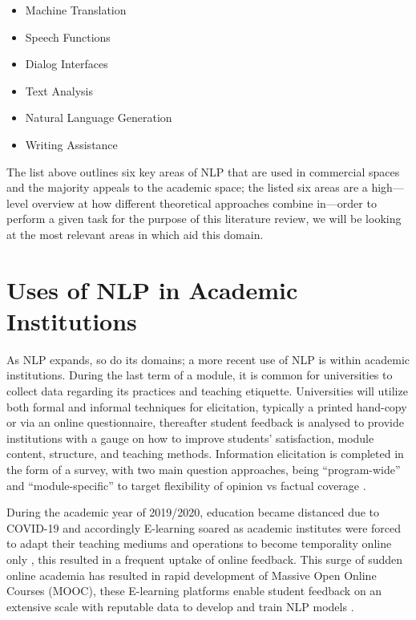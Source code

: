 \begin{itemize}
    \item Machine Translation
    \item Speech Functions
    \item Dialog Interfaces
    \item Text Analysis
    \item Natural Language Generation
    \item Writing Assistance
\end{itemize}

The list above outlines six key areas of NLP that are used in commercial spaces and the majority appeals to the academic space; the listed six areas are a high---level overview at how different theoretical approaches combine in---order to perform a given task \parencite{dale2019nlp} for the purpose of this literature review, we will be looking at the most relevant areas in which aid this domain.

\section{Uses of NLP in Academic Institutions}

As NLP expands, so do its domains; a more recent use of NLP is within academic institutions. During the last term of a module, it is common for universities to collect data regarding its practices and teaching etiquette. Universities will utilize both formal and informal techniques for elicitation, typically a printed hand-copy or via an online questionnaire, thereafter student feedback is analysed to provide institutions with a gauge on how to improve students’ satisfaction, module content, structure, and teaching methods. Information elicitation is completed in the form of a survey, with two main question approaches, being “program-wide” and “module-specific” to target flexibility of opinion vs factual coverage \parencite{keane2005obtaining, beran2007s}.

During the academic year of 2019/2020, education became distanced due to COVID-19 and accordingly E-learning soared as academic institutes were forced to adapt their teaching mediums and operations to become temporality online only \parencite{burgess2020schools}, this resulted in a frequent uptake of online feedback. This surge of sudden online academia has resulted in rapid development of Massive Open Online Courses (MOOC), these E-learning platforms enable student feedback on an extensive scale with reputable data to develop and train NLP models \parencite{wang2021predicting}.

